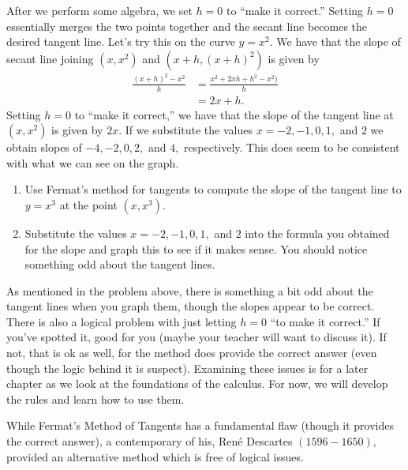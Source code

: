 After we perform some algebra, we set $h=0$ to ``make it correct.''
Setting $h=0$ essentially merges the two points together and the
secant line becomes the desired tangent line.  Let's try this on the
curve $y=x^2.$ We have that the slope of secant line joining $(x,x^2)$
and $(x+h,(x+h)^2)$ is given by
\begin{align*}
  \frac{(x+h)^2-x^2}{h}&=\frac{x^2+2xh+h^2-x^2)}{h}\\
  &=2x+h.
\end{align*}
Setting $h=0$ to ``make it correct,'' we have that the slope of the
tangent line at $(x,x^2 )$ is given by $2x.$ If we substitute the
values $x=-2, -1, 0, 1,$ and $ 2$ we obtain slopes of $-4, -2, 0, 2,$
and $4,$ respectively.  This does seem to be consistent with what we
can see on  the graph.

\begin{embeddedproblem}{}
  \begin{enumerate}
  \item Use Fermat's method for tangents to compute the slope of the
    tangent line to $y=x^3$ at the point $(x,x^3).$
  \item Substitute the values $x=-2, -1, 0, 1,$ and $2$ into the formula you
    obtained for the slope and graph this to see if it makes sense.
    You should notice something odd about the tangent lines.
  \end{enumerate}
\end{embeddedproblem}

As mentioned in the problem above, there is something a bit odd about
the tangent lines when you graph them, though the slopes appear to be
correct.  There is also a logical problem with just letting $h=0$ ``to
make it correct.''  If you've spotted it, good for you (maybe your
teacher will want to discuss it).  If not, that is ok as well, for the
method does provide the correct answer (even though the logic behind
it is suspect).  Examining these issues is for a later chapter as we
look at the foundations of the calculus.  For now, we will develop the
rules and learn how to use them.

While Fermat's Method of Tangents has a fundamental flaw (though it
provides the correct answer), a contemporary of his, Ren\'e{} Descartes
$(1596-1650),$ provided an alternative method which is free of logical
issues.

